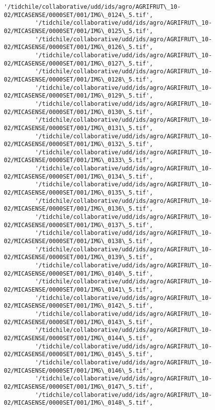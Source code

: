 \documentclass[11pt]{article}
\begin{document}
\begin{Verbatim}[commandchars=\\\{\}]
         '/tidchile/collaborative/udd/ids/agro/AGRIFRUT\_10-02/MICASENSE/0000SET/001/IMG\_0124\_5.tif',
         '/tidchile/collaborative/udd/ids/agro/AGRIFRUT\_10-02/MICASENSE/0000SET/001/IMG\_0125\_5.tif',
         '/tidchile/collaborative/udd/ids/agro/AGRIFRUT\_10-02/MICASENSE/0000SET/001/IMG\_0126\_5.tif',
         '/tidchile/collaborative/udd/ids/agro/AGRIFRUT\_10-02/MICASENSE/0000SET/001/IMG\_0127\_5.tif',
         '/tidchile/collaborative/udd/ids/agro/AGRIFRUT\_10-02/MICASENSE/0000SET/001/IMG\_0128\_5.tif',
         '/tidchile/collaborative/udd/ids/agro/AGRIFRUT\_10-02/MICASENSE/0000SET/001/IMG\_0129\_5.tif',
         '/tidchile/collaborative/udd/ids/agro/AGRIFRUT\_10-02/MICASENSE/0000SET/001/IMG\_0130\_5.tif',
         '/tidchile/collaborative/udd/ids/agro/AGRIFRUT\_10-02/MICASENSE/0000SET/001/IMG\_0131\_5.tif',
         '/tidchile/collaborative/udd/ids/agro/AGRIFRUT\_10-02/MICASENSE/0000SET/001/IMG\_0132\_5.tif',
         '/tidchile/collaborative/udd/ids/agro/AGRIFRUT\_10-02/MICASENSE/0000SET/001/IMG\_0133\_5.tif',
         '/tidchile/collaborative/udd/ids/agro/AGRIFRUT\_10-02/MICASENSE/0000SET/001/IMG\_0134\_5.tif',
         '/tidchile/collaborative/udd/ids/agro/AGRIFRUT\_10-02/MICASENSE/0000SET/001/IMG\_0135\_5.tif',
         '/tidchile/collaborative/udd/ids/agro/AGRIFRUT\_10-02/MICASENSE/0000SET/001/IMG\_0136\_5.tif',
         '/tidchile/collaborative/udd/ids/agro/AGRIFRUT\_10-02/MICASENSE/0000SET/001/IMG\_0137\_5.tif',
         '/tidchile/collaborative/udd/ids/agro/AGRIFRUT\_10-02/MICASENSE/0000SET/001/IMG\_0138\_5.tif',
         '/tidchile/collaborative/udd/ids/agro/AGRIFRUT\_10-02/MICASENSE/0000SET/001/IMG\_0139\_5.tif',
         '/tidchile/collaborative/udd/ids/agro/AGRIFRUT\_10-02/MICASENSE/0000SET/001/IMG\_0140\_5.tif',
         '/tidchile/collaborative/udd/ids/agro/AGRIFRUT\_10-02/MICASENSE/0000SET/001/IMG\_0141\_5.tif',
         '/tidchile/collaborative/udd/ids/agro/AGRIFRUT\_10-02/MICASENSE/0000SET/001/IMG\_0142\_5.tif',
         '/tidchile/collaborative/udd/ids/agro/AGRIFRUT\_10-02/MICASENSE/0000SET/001/IMG\_0143\_5.tif',
         '/tidchile/collaborative/udd/ids/agro/AGRIFRUT\_10-02/MICASENSE/0000SET/001/IMG\_0144\_5.tif',
         '/tidchile/collaborative/udd/ids/agro/AGRIFRUT\_10-02/MICASENSE/0000SET/001/IMG\_0145\_5.tif',
         '/tidchile/collaborative/udd/ids/agro/AGRIFRUT\_10-02/MICASENSE/0000SET/001/IMG\_0146\_5.tif',
         '/tidchile/collaborative/udd/ids/agro/AGRIFRUT\_10-02/MICASENSE/0000SET/001/IMG\_0147\_5.tif',
         '/tidchile/collaborative/udd/ids/agro/AGRIFRUT\_10-02/MICASENSE/0000SET/001/IMG\_0148\_5.tif',

\end{Verbatim}
\end{document}
